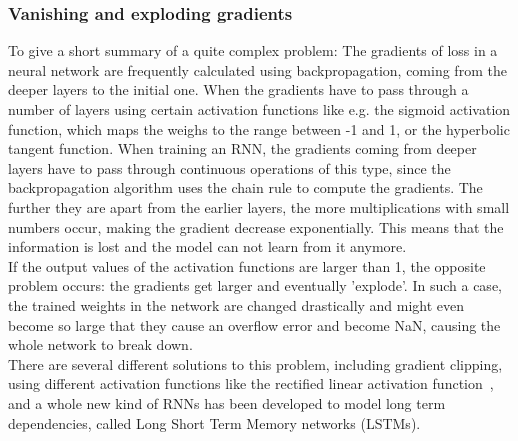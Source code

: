 \documentclass[
	a4paper,
	pagesize,
	pdftex,
	12pt,
	twoside, %
	BCOR=5mm, %
	ngerman,
	fleqn,
	final,
	]{scrartcl}
\begin{document}
\subsubsection{Vanishing and exploding gradients}
To give a short summary of a quite complex problem: The gradients of loss in a neural network are frequently calculated using backpropagation, coming from the deeper layers to the initial one. When the gradients have to pass through a number of layers using certain activation functions like e.g. the sigmoid activation function, which maps the weighs to the range between -1 and 1, or the hyperbolic tangent function. When training an RNN, the gradients coming from deeper layers have to pass through continuous operations of this type, since the backpropagation algorithm uses the chain rule to compute the gradients. The further they are apart from the earlier layers, the more multiplications with small numbers occur, making the gradient decrease exponentially. This means that the information is lost and the model can not learn from it anymore.\\
If the output values of the activation functions are larger than 1, the opposite problem occurs: the gradients get larger and eventually 'explode'. In such a case, the trained weights in the network are changed drastically and might even become so large that they cause an overflow error and become NaN, causing the whole network to break down.\\
There are several different solutions to this problem, including gradient clipping, using different activation functions like the rectified linear activation function~\cite{Glorot.2011}, and a whole new kind of RNNs has been developed to model long term dependencies, called Long Short Term Memory networks (LSTMs).
\end{document}
